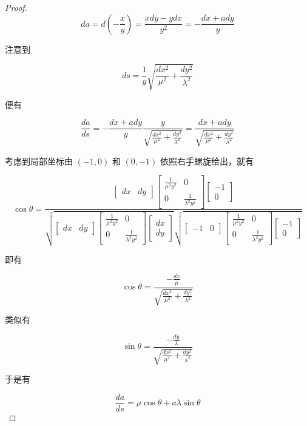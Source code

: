\documentclass[a4paper,12pt]{article}
\numberwithin{definition}{section}
\numberwithin{lemma}{section}
\numberwithin{proposition}{section}
\numberwithin{theorem}{section}
\numberwithin{grammar}{section}
\numberwithin{program}{section}
\numberwithin{convention}{section}
\numberwithin{corollary}{section}
\begin{document}
\begin{proof}
$$
da = d(-\frac{x}{y}) = \frac{xdy - ydx}{y^2} = -\frac{dx + a dy}{y}
$$

注意到

$$
ds = \frac{1}{y}\sqrt{\frac{dx^2}{\mu^2} + \frac{dy^2}{\lambda^2}}
$$

便有

$$
\frac{da}{ds} = - \frac{dx + a dy}{y} \frac{y}{\sqrt{\frac{dx^2}{\mu^2} + \frac{dy^2}{\lambda^2}}} = \frac{dx + a dy}{\sqrt{\frac{dx^2}{\mu^2} + \frac{dy^2}{\lambda^2}}}
$$

考虑到局部坐标由 $(-1, 0)$ 和 $(0, -1)$ 依照右手螺旋给出，就有

$$
\cos \theta = \frac{\begin{bmatrix} dx & dy \end{bmatrix} \begin{bmatrix} \frac{1}{\mu^2 y^2} & 0 \\ 0 & \frac{1}{\lambda^2 y^2} \end{bmatrix} \begin{bmatrix} -1 \\ 0 \end{bmatrix}}{\sqrt{\begin{bmatrix} dx & dy \end{bmatrix} \begin{bmatrix} \frac{1}{\mu^2 y^2} & 0 \\ 0 & \frac{1}{\lambda^2 y^2} \end{bmatrix} \begin{bmatrix} dx \\ dy \end{bmatrix}}\sqrt{\begin{bmatrix} -1 & 0 \end{bmatrix} \begin{bmatrix} \frac{1}{\mu^2 y^2} & 0 \\ 0 & \frac{1}{\lambda^2 y^2} \end{bmatrix} \begin{bmatrix} -1 \\ 0 \end{bmatrix}}}
$$

即有

$$
\cos \theta = \frac{-\frac{dx}{\mu}}{\sqrt{\frac{dx^2}{\mu^2} + \frac{dy^2}{\lambda^2}}}
$$

类似有

$$
\sin \theta = \frac{-\frac{dy}{\lambda}}{\sqrt{\frac{dx^2}{\mu^2} + \frac{dy^2}{\lambda^2}}}
$$

于是有

$$
\frac{da}{ds} = \mu \cos \theta + a \lambda \sin \theta
$$

\end{proof}
\end{document}
